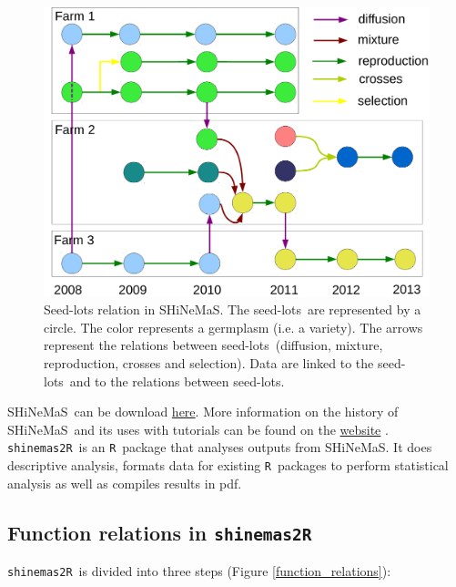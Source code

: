 \documentclass{article}\usepackage[]{graphicx}\usepackage[]{color}
\newcommand{\R}{\texttt{R}}
\renewcommand{\sl}{seed-lots}
\newcommand{\BD}{SHiNeMaS}
\newcommand{\pack}{\texttt{shinemas2R}}
\begin{document}
\begin{figure}[H]
\begin{center}
\includegraphics[width=.8\textwidth]{relation_SL_EN}
\caption{
Seed-lots relation in \BD. 
The \sl~are represented by a circle.
The color represents a germplasm (i.e. a variety).
The arrows represent the relations between \sl~(diffusion, mixture, reproduction, crosses and selection).
Data are linked to the \sl~and to the relations between \sl.
}
\label{relation_SL}
\end{center}
\end{figure}

\BD~can be download \href{http://moulon.inra.fr/index.php/en/tranverse-team/atelier-de-bioinformatique/projects/181}{here}.
More information on the history of \BD~and its uses with tutorials can be found on the \href{http://moulon.inra.fr/index.php/en/tranverse-team/atelier-de-bioinformatique/projects/181}{website} \citep{deoliveira_shinemas_2015}.\\

\pack~is an \R~package that analyses outputs from \BD.
It does descriptive analysis, formats data for existing \R~packages to perform statistical analysis as well as compiles results in pdf.


\subsection{Function relations in \pack}

\pack~is divided into three steps (Figure \ref{function_relations}):
\end{document}
